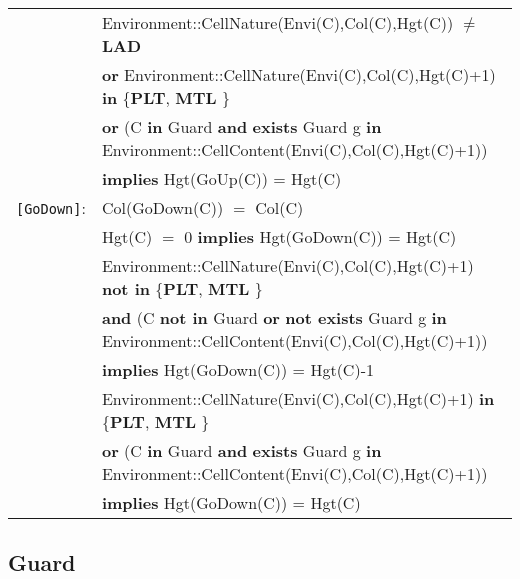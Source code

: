\documentclass[8pt]{article}
\begin{document}
{\begin{longtable}{rl}
  & \textrm{Environment::CellNature(Envi(C),Col(C),Hgt(C))} $\neq$ \textbf{LAD} \\
  & \quad\quad \textbf{or} \textrm{Environment::CellNature(Envi(C),Col(C),Hgt(C)+1)} \textbf{in} \{\textbf{PLT}, \textbf{MTL} \} \\
  & \quad\quad \textbf{or} (\textrm{C} \textbf{in} \textrm{Guard} \textbf{and} \textbf{exists} \textrm{Guard} g \textbf{in} \textrm{Environment::CellContent(Envi(C),Col(C),Hgt(C)+1)}) \\
  & \quad\quad \textbf{implies} \textrm{Hgt(GoUp(C))} = \textrm{Hgt(C)} \\
\texttt{[GoDown]}: & \textrm{Col(GoDown(C))} $=$ \textrm{Col(C)} \\
  & \textrm{Hgt(C)} $=$ 0 \textbf{implies} \textrm{Hgt(GoDown(C))} = \textrm{Hgt(C)} \\
  & \textrm{Environment::CellNature(Envi(C),Col(C),Hgt(C)+1)} \textbf{not in} \{\textbf{PLT}, \textbf{MTL} \} \\
  & \quad\quad \textbf{and} (\textrm{C} \textbf{not in} \textrm{Guard} \textbf{or} \textbf{not exists} \textrm{Guard} g \textbf{in} \textrm{Environment::CellContent(Envi(C),Col(C),Hgt(C)+1)}) \\
  & \quad\quad \textbf{implies} \textrm{Hgt(GoDown(C))} = \textrm{Hgt(C)}-1 \\
  & \textrm{Environment::CellNature(Envi(C),Col(C),Hgt(C)+1)} \textbf{in} \{\textbf{PLT}, \textbf{MTL} \} \\
  & \quad\quad \textbf{or} (\textrm{C} \textbf{in} \textrm{Guard} \textbf{and} \textbf{exists} \textrm{Guard} g \textbf{in} \textrm{Environment::CellContent(Envi(C),Col(C),Hgt(C)+1)}) \\
  & \quad\quad \textbf{implies} \textrm{Hgt(GoDown(C))} = \textrm{Hgt(C)} \\
\end{longtable}}

\subsection{Guard}
\end{document}
